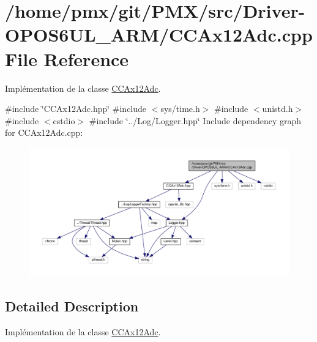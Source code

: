 \hypertarget{Driver-OPOS6UL__ARM_2CCAx12Adc_8cpp}{}\section{/home/pmx/git/\+P\+M\+X/src/\+Driver-\/\+O\+P\+O\+S6\+U\+L\+\_\+\+A\+R\+M/\+C\+C\+Ax12\+Adc.cpp File Reference}
\label{Driver-OPOS6UL__ARM_2CCAx12Adc_8cpp}


Implémentation de la classe \hyperlink{classCCAx12Adc}{C\+C\+Ax12\+Adc}.  


{\ttfamily \#include \char`\"{}C\+C\+Ax12\+Adc.\+hpp\char`\"{}}\newline
{\ttfamily \#include $<$sys/time.\+h$>$}\newline
{\ttfamily \#include $<$unistd.\+h$>$}\newline
{\ttfamily \#include $<$cstdio$>$}\newline
{\ttfamily \#include \char`\"{}../\+Log/\+Logger.\+hpp\char`\"{}}\newline
Include dependency graph for C\+C\+Ax12\+Adc.\+cpp\+:
\nopagebreak
\begin{figure}[H]
\begin{center}
\leavevmode
\includegraphics[width=350pt]{Driver-OPOS6UL__ARM_2CCAx12Adc_8cpp__incl}
\end{center}
\end{figure}


\subsection{Detailed Description}
Implémentation de la classe \hyperlink{classCCAx12Adc}{C\+C\+Ax12\+Adc}. 

